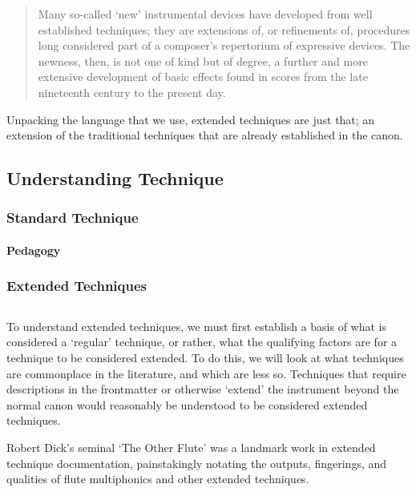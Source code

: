 \begin{quotation}
    Many so-called ‘new’ instrumental devices have developed from well established techniques; they are extensions of, or refinements of, procedures long considered part of a composer’s repertorium of expressive devices. The newness, then, is not one of kind but of degree, a further and more extensive development of basic effects found in scores from the late nineteenth century to the present day.\autocite[3]{readContemporaryInstrumentalTechniques1976}
\end{quotation}

Unpacking the language that we use, extended techniques are just that; an extension of the traditional techniques that are already established in the canon. 

\subsection{Understanding Technique}

\subsubsection{Standard Technique}



\paragraph{Pedagogy}

\subsubsection{Extended Techniques}

\subsection{}
To understand extended techniques, we must first establish a basis of what is considered a `regular' technique, or rather, what the qualifying factors are for a technique to be considered extended.
To do this, we will look at what techniques are commonplace in the literature, and which are less so.
Techniques that require descriptions in the frontmatter or otherwise `extend' the instrument beyond the normal canon would reasonably be understood to be considered extended techniques.



Robert Dick's seminal `The Other Flute' was a landmark work in extended technique documentation, painstakingly notating the outputs, fingerings, and qualities of flute multiphonics and other extended techniques.\autocite{dickOtherFlute1989}


